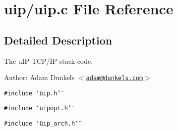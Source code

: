 \hypertarget{a00053}{
\section{uip/uip.c File Reference}
\label{a00053}
}


\subsection{Detailed Description}
The u\-IP TCP/IP stack code. 

\begin{Desc}
\item[Author:]Adam Dunkels $<$\href{mailto:adam@dunkels.com}{\tt adam@dunkels.com}$>$ \end{Desc}


{\tt \#include \char`\"{}uip.h\char`\"{}}\par
{\tt \#include \char`\"{}uipopt.h\char`\"{}}\par
{\tt \#include \char`\"{}uip\_\-arch.h\char`\"{}}\par


